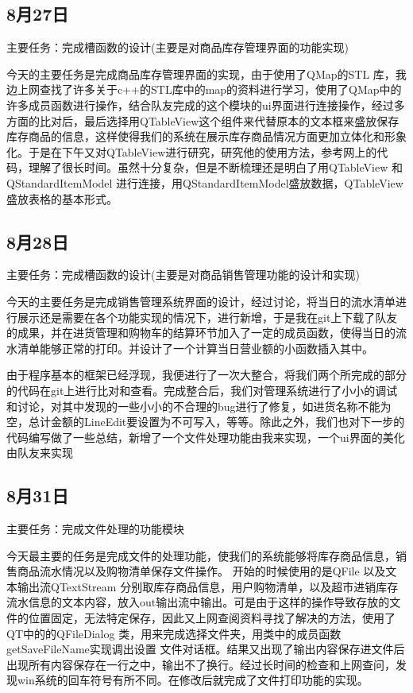 \documentclass[
   projtype=report, %
   output=print,     %
  ]{nwafuprojrep}
\begin{document}
\subsection{8月27日}
主要任务：完成槽函数的设计(主要是对商品库存管理界面的功能实现)

	今天的主要任务是完成商品库存管理界面的实现，由于使用了QMap的STL 库，我边上网查找了许多关于c++的STL库中的map的资料进行学习，使用了QMap中的许多成员函数进行操作，结合队友完成的这个模块的ui界面进行连接操作，经过多方面的比对后，最后选择用QTableView这个组件来代替原本的文本框来盛放保存库存商品的信息，这样使得我们的系统在展示库存商品情况方面更加立体化和形象化。于是在下午又对QTableView进行研究，研究他的使用方法，参考网上的代码，理解了很长时间。虽然十分复杂，但是不断梳理还是明白了用QTableView 和QStandardItemModel 进行连接，用QStandardItemModel盛放数据，QTableView盛放表格的基本形式。
\subsection{8月28日}
主要任务：完成槽函数的设计(主要是对商品销售管理功能的设计和实现)

	今天的主要任务是完成销售管理系统界面的设计，经过讨论，将当日的流水清单进行展示还是需要在各个功能实现的情况下，进行新增，于是我在git上下载了队友的成果，并在进货管理和购物车的结算环节加入了一定的成员函数，使得当日的流水清单能够正常的打印。并设计了一个计算当日营业额的小函数插入其中。
	
	由于程序基本的框架已经浮现，我便进行了一次大整合，将我们两个所完成的部分的代码在git上进行比对和查看。完成整合后，我们对管理系统进行了小小的调试和讨论，对其中发现的一些小小的不合理的bug进行了修复，如进货名称不能为空，总计金额的LineEdit要设置为不可写入，等等。除此之外，我们也对下一步的代码编写做了一些总结，新增了一个文件处理功能由我来实现，一个ui界面的美化由队友来实现
\subsection{8月31日}
主要任务：完成文件处理的功能模块

今天最主要的任务是完成文件的处理功能，使我们的系统能够将库存商品信息，销售商品流水情况以及购物清单保存文件操作。
开始的时候使用的是QFile 以及文本输出流QTextStream 分别取库存商品信息，用户购物清单，以及超市进销库存流水信息的文本内容，放入out输出流中输出。可是由于这样的操作导致存放的文件的位置固定，无法特定保存，因此又上网查阅资料寻找了解决的方法，使用了QT中的的QFileDialog 类，用来完成选择文件夹，用类中的成员函数getSaveFileName实现调出设置
文件对话框。结果又出现了输出内容保存进文件后出现所有内容保存在一行之中，输出不了换行。经过长时间的检查和上网查问，发现win系统的回车符号有所不同。在修改后就完成了文件打印功能的实现。
\end{document}
